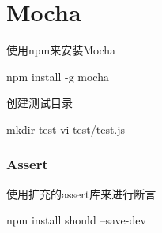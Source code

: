 \chapter{Mocha}

使用npm来安装Mocha
\begin{Bash}
npm install -g mocha
\end{Bash}
创建测试目录
\begin{Bash}
mkdir test
vi test/test.js
\end{Bash}

\subsection{Assert}
使用扩充的assert库来进行断言
\begin{Bash}
npm install should --save-dev
\end{Bash}